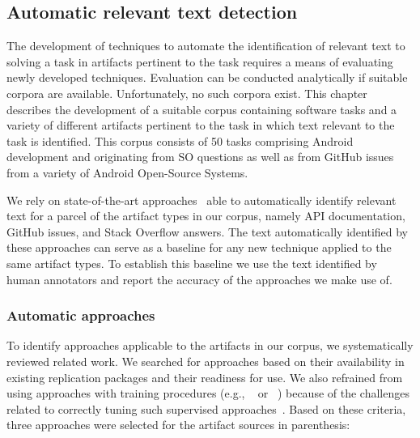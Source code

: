 
\subsection{Automatic relevant text detection}
\label{cp4:relevant-text-auto}



The development of techniques
to automate the identification of relevant text
to solving a task in artifacts
pertinent to the task requires a
means of evaluating newly developed
techniques. Evaluation can be conducted
analytically if suitable corpora are
available. Unfortunately, no such corpora
exist. This chapter describes the
development of a suitable corpus
containing
software tasks
and a variety of different artifacts pertinent
to the task in which text relevant to the
task is identified.
This corpus consists of 
50 tasks comprising Android development and originating from \acf{SO} questions
as well as from GitHub issues from a variety of Android Open-Source Systems.




We rely on state-of-the-art approaches~\cite{nadi2020, Robillard2015, Lotufo2012, Xu2017} able to automatically identify relevant text for a parcel of the  artifact types in our corpus, namely API documentation, GitHub issues, and Stack Overflow answers.
The text automatically identified by these approaches can serve as a baseline for 
any new technique applied to the same artifact types. 
To establish this baseline we use the text identified by human annotators and report the accuracy of the approaches we make use of.


\subsubsection{Automatic approaches}


To identify approaches applicable to the artifacts in our corpus, we systematically reviewed related work. We searched for approaches based on their availability in existing replication packages and their readiness for use.
We also refrained from using approaches with training procedures (e.g., ~\cite{liu2020} or ~\cite{Treude2016}) because of the challenges related to correctly tuning such supervised approaches~\cite{Chaparro2017, fucci2019}. Based on these criteria, three approaches were selected for the artifact sources in parenthesis:



